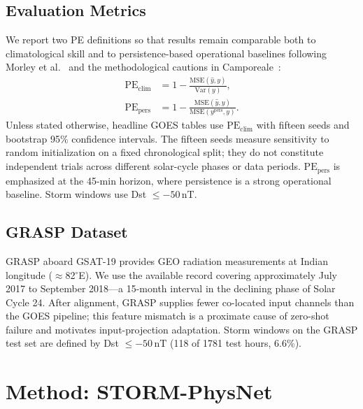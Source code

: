 ﻿\documentclass{ieeeaccess}
\begin{document}
\subsection{Evaluation Metrics}
We report two PE definitions so that results remain comparable both to
climatological skill and to persistence-based operational baselines
following Morley et al.~\cite{b22} and the methodological cautions in
Camporeale~\cite{b21}:
\begin{align}
\mathrm{PE}_{\mathrm{clim}}
&= 1 - \frac{\mathrm{MSE}(\hat y,y)}{\mathrm{Var}(y)}, \\
\mathrm{PE}_{\mathrm{pers}}
&= 1 - \frac{\mathrm{MSE}(\hat y,y)}{\mathrm{MSE}(y^{\mathrm{pers}},y)}.
\end{align}
Unless stated otherwise, headline GOES tables use \(\mathrm{PE}_{\mathrm{clim}}\)
with fifteen seeds and bootstrap 95\% confidence intervals. The fifteen seeds measure sensitivity to random initialization on a fixed chronological split; they do not constitute independent trials across different solar-cycle phases or data periods. \(\mathrm{PE}_{\mathrm{pers}}\) is emphasized at the 45-min horizon,
where persistence is a strong operational baseline.
Storm windows use Dst \(\le -50\,\mathrm{nT}\).

\subsection{GRASP Dataset}
GRASP aboard GSAT-19 provides GEO radiation measurements at Indian longitude
(\(\approx\)82\(^\circ\)E). We use the available record covering approximately
July 2017 to September 2018---a 15-month interval in the declining phase of Solar
Cycle 24. After alignment, GRASP supplies fewer co-located input channels than the
GOES pipeline; this feature mismatch is a proximate cause of zero-shot failure and
motivates input-projection adaptation. Storm windows on the GRASP test set are
defined by Dst \(\le -50\,\mathrm{nT}\) (118 of 1781 test hours, 6.6\%).

\section{Method: STORM-PhysNet}
\label{sec:method}
\end{document}
